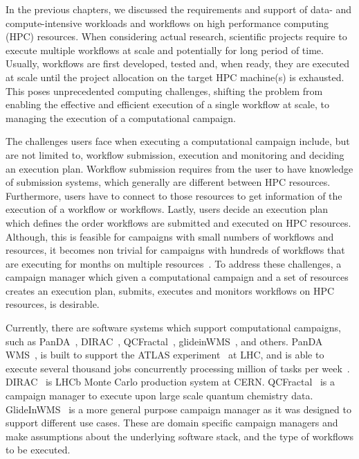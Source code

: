 \label{ch:cmanager}

In the previous chapters, we discussed the requirements and support of data- and compute-intensive workloads and workflows on high performance computing (HPC) resources. 
When considering actual research, scientific projects require to execute multiple workflows at scale and potentially for long period of time.
Usually, workflows are first developed, tested and, when ready, they are executed at scale until the project allocation on the target HPC machine(s) is exhausted. 
This poses unprecedented computing challenges, shifting the problem from enabling the effective and efficient execution of a single workflow at scale, to managing the execution of a computational campaign.

The challenges users face when executing a computational campaign include, but are not limited to, workflow submission, execution and monitoring and deciding an execution plan.
Workflow submission requires from the user to have knowledge of submission systems, which generally are different between HPC resources.
Furthermore, users have to connect to those resources to get information of the execution of a workflow or workflows.
Lastly, users decide an execution plan which defines the order workflows are submitted and executed on HPC resources.
Although, this is feasible for campaigns with small numbers of workflows and resources, it becomes non trivial for campaigns with hundreds of workflows that are executing for months on multiple resources~\cite{smith2020molssi}.
To address these challenges, a campaign manager which given a computational campaign and a set of resources creates an execution plan, submits, executes and monitors workflows on HPC resources, is desirable.

Currently, there are software systems which support computational campaigns, such as PanDA~\cite{maeno2008panda}, DIRAC~\cite{casajus2010dirac}, QCFractal~\cite{qcfractal}, glideinWMS~\cite{sfiligoi2008glidein}, and others.
PanDA WMS~\cite{maeno2008panda}, is built to support the ATLAS experiment~\cite{atlas} at LHC, and is able to execute several thousand jobs concurrently processing million of tasks per week~\cite{de2015future}.
DIRAC~\cite{tsaregorodtsev2003dirac} is LHCb Monte Carlo production system at CERN.
QCFractal~\cite{qcfractal} is a campaign manager to execute upon large scale quantum chemistry data.
GlideInWMS~\cite{sfiligoi2008glidein} is a more general purpose campaign manager as it was designed to support different use cases.
These are domain specific campaign managers and make assumptions about the underlying software stack, and the type of workflows to be executed.

